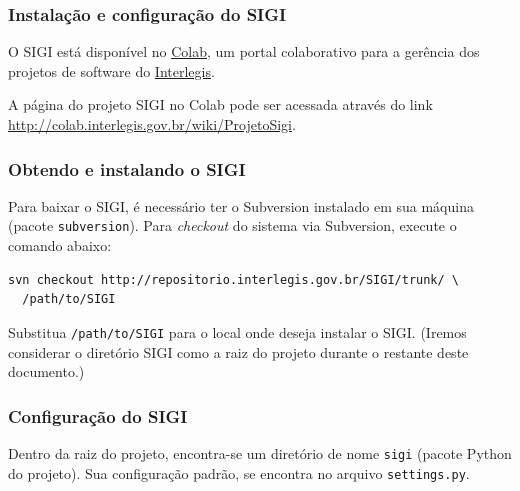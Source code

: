 
\hypertarget{instala-o-e-configura-o-do-sigi}{}
\subsubsection{Instalação e configuração do SIGI}

O SIGI está disponível no \href{http://colab.interlegis.gov.br}{Colab},
um portal colaborativo para a gerência dos projetos de software do
\href{http://www.interlegis.gov.br}{Interlegis}.

A página do projeto SIGI no Colab pode ser acessada através do link
\href{http://colab.interlegis.gov.br/wiki/ProjetoSigi}{http://colab.interlegis.gov.br/wiki/ProjetoSigi}.



\hypertarget{obtendo-e-instalando-o-sigi}{}
\subsubsection*{Obtendo e instalando o SIGI}

Para baixar o SIGI, é necessário ter o Subversion instalado em sua
máquina (pacote \texttt{subversion}). Para \emph{checkout} do sistema via
Subversion, execute o comando abaixo:
\begin{verbatim}
svn checkout http://repositorio.interlegis.gov.br/SIGI/trunk/ \
  /path/to/SIGI
\end{verbatim}

Substitua \texttt{/path/to/SIGI} para o local onde deseja instalar o
SIGI. (Iremos considerar o diretório SIGI como a raiz do projeto
durante o restante deste documento.)



\hypertarget{configura-o-do-sigi}{}
\subsubsection*{Configuração do SIGI}

Dentro da raiz do projeto, encontra-se um diretório de nome \texttt{sigi}
(pacote Python do projeto). Sua configuração padrão, se encontra no
arquivo \texttt{settings.py}.

